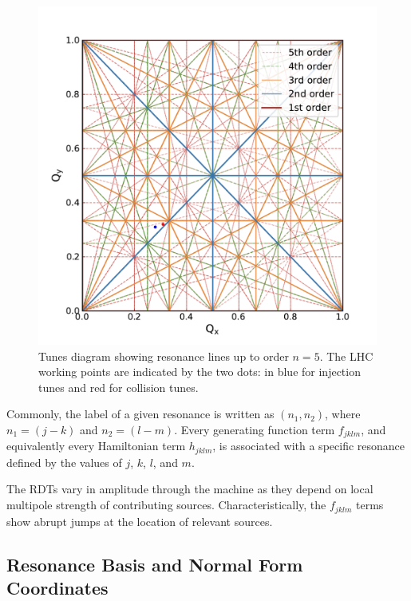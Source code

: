 \begin{figure}[!htb]
    \centering
    \includegraphics[width=\linewidth]{Figures/Beam_Dynamics_Theory/tune_diagram_fifth_order_with_working_points.pdf}
    \caption{Tunes diagram showing resonance lines up to order \(n = 5\). The LHC working points are indicated by the two dots: in \textcolor{wpblue}{blue} for injection tunes and \textcolor{wpred}{red} for collision tunes.}
    \label{figure:tune_diagram_fifth_order}
\end{figure}

Commonly, the label of a given resonance is written as \(\left( n_1, n_2 \right)\), where \(n_1 = \left( j - k \right)\) and \(n_2 = \left( l - m \right)\).
Every generating function term \(f_{jklm}\), and equivalently every Hamiltonian term \(h_{jklm}\), is associated with a specific resonance defined by the values of \(j\), \(k\), \(l\), and \(m\).

The \glspl{RDT} vary in amplitude through the machine as they depend on local multipole strength of contributing sources.
Characteristically, the \(f_{jklm}\) terms show abrupt jumps at the location of relevant sources.

\subsection{Resonance Basis and Normal Form Coordinates}

